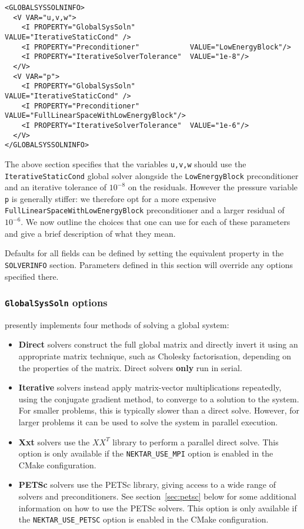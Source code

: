 \begin{lstlisting}[style=XMLStyle]
<GLOBALSYSSOLNINFO>
  <V VAR="u,v,w">
    <I PROPERTY="GlobalSysSoln"             VALUE="IterativeStaticCond" />
    <I PROPERTY="Preconditioner"            VALUE="LowEnergyBlock"/>
    <I PROPERTY="IterativeSolverTolerance"  VALUE="1e-8"/>
  </V>
  <V VAR="p">
    <I PROPERTY="GlobalSysSoln"             VALUE="IterativeStaticCond" />
    <I PROPERTY="Preconditioner"     VALUE="FullLinearSpaceWithLowEnergyBlock"/>
    <I PROPERTY="IterativeSolverTolerance"  VALUE="1e-6"/>
  </V>
</GLOBALSYSSOLNINFO>
\end{lstlisting}

The above section specifies that the variables \texttt{u,v,w} should use the
\texttt{IterativeStaticCond} global solver alongside the \texttt{LowEnergyBlock}
preconditioner and an iterative tolerance of $10^{-8}$ on the residuals. However
the pressure variable \texttt{p} is generally stiffer: we therefore opt for a
more expensive \texttt{FullLinearSpaceWithLowEnergyBlock} preconditioner and a
larger residual of $10^{-6}$. We now outline the choices that one can use for
each of these parameters and give a brief description of what they mean.

Defaults for all fields can be defined by setting the equivalent property in
the \texttt{SOLVERINFO} section. Parameters defined in this section will
override any options specified there.


\subsubsection{\texttt{GlobalSysSoln} options}

\nekpp presently implements four methods of solving a global system:

\begin{itemize}
  \item \textbf{Direct} solvers construct the full global matrix and directly
  invert it using an appropriate matrix technique, such as Cholesky
  factorisation, depending on the properties of the matrix. Direct solvers
  \textbf{only} run in serial.
  \item \textbf{Iterative} solvers instead apply matrix-vector multiplications
  repeatedly, using the conjugate gradient method, to converge to a solution to
  the system. For smaller problems, this is typically slower than a direct
  solve. However, for larger problems it can be used to solve the system in
  parallel execution.
  \item \textbf{Xxt} solvers use the $XX^T$ library to perform a parallel direct
  solve. This option is only available if the \texttt{NEKTAR\_USE\_MPI} option
  is enabled in the CMake configuration.
  \item \textbf{PETSc} solvers use the PETSc library, giving access to a wide
  range of solvers and preconditioners. See section~\ref{sec:petsc} below for
  some additional information on how to use the PETSc solvers. This option is
  only available if the \texttt{NEKTAR\_USE\_PETSC} option is enabled in the
  CMake configuration.
\end{itemize}


